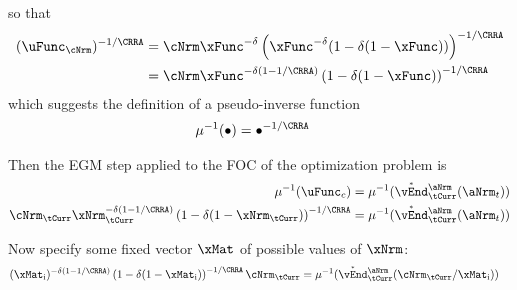\documentclass[./SolvingMicroDSOPs]{subfiles}
\begin{document}
{{\begin{align}
				\end{align}
				so that
				\begin{align}
					(\uFunc_{\cNrm})^{-1/\CRRA} & = \cNrm \xFunc^{-\wealthU} \left(\xFunc^{-\wealthU}(1-\wealthU(1-\xFunc))\right)^{-1/\CRRA}\\
					& = \cNrm \xFunc^{-\wealthU(1-1/\CRRA)} \left(1-\wealthU(1-\xFunc)\right)^{-1/\CRRA} \notag
				\end{align}
				which suggests the definition of a pseudo-inverse function
				\begin{align}
					\muInv(\bullet) & = \bullet^{-1/\CRRA}                              
				\end{align}
				
				Then the EGM step applied to the FOC of the optimization problem is 
				\begin{align}
					\muInv(\uFunc_{c}) & = \muInv(\Maxed{\vEnd}^{\aNrm}_{\tCurr}(\aNrm_{t}))
					\\ \cNrm_{\tCurr} \xNrm_{\tCurr}^{-\wealthU(1-1/\CRRA)} \left(1-\wealthU(1-\xNrm_{\tCurr})\right)^{-1/\CRRA} & = \muInv(\Maxed{\vEnd}^{\aNrm}_{\tCurr}(\aNrm_{t})) \notag
				\end{align}
				
				Now specify some fixed vector $\xMat$ of possible values of $\xNrm$:
				\begin{align}
					(\xMat_{\aIdx})^{-\wealthU(1-1/\CRRA)} \left(1-\wealthU(1-\xMat_{\aIdx})\right)^{-1/\CRRA} \cNrm_{\tCurr} & = \muInv(\Maxed{\vEnd}^{\aNrm}_{\tCurr}(\cNrm_{\tCurr}/\xMat_{\aIdx})) \notag
				\end{align}  
				
}}
\end{document}
